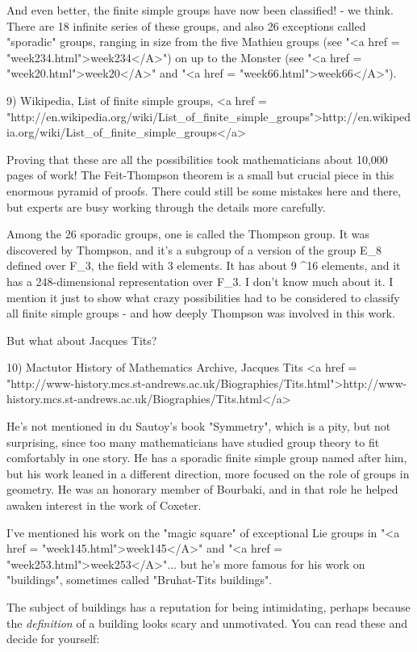 And even better, the finite simple groups have now been classified! -
we think.  There are 18 infinite series of these groups, and also 26
exceptions called "sporadic" groups, ranging in size from
the five Mathieu groups (see "<a href =
"week234.html">week234</A>") on up to the Monster (see "<a
href = "week20.html">week20</A>" and "<a href =
"week66.html">week66</A>").

9) Wikipedia, List of finite simple groups, 
<a href = "http://en.wikipedia.org/wiki/List_of_finite_simple_groups">http://en.wikipedia.org/wiki/List_of_finite_simple_groups</a>

Proving that these are all the possibilities took mathematicians 
about 10,000 pages of work!  The Feit-Thompson theorem is a small 
but crucial piece in this enormous pyramid of proofs.  There could 
still be some mistakes here and there, but experts are busy working 
through the details more carefully.

Among the 26 sporadic groups, one is called the Thompson group.  It
was discovered by Thompson, and it's a subgroup of a version of the
group E_{8} defined over F_{3}, the field with 3
elements.  It has about 9 ^{16} elements, and it has
a 248-dimensional representation over F_{3}.  I don't know
much about it.  I mention it just to show what crazy possibilities had
to be considered to classify all finite simple groups - and how deeply
Thompson was involved in this work.

But what about Jacques Tits?

10) Mactutor History of Mathematics Archive, Jacques Tits
<a href = "http://www-history.mcs.st-andrews.ac.uk/Biographies/Tits.html">http://www-history.mcs.st-andrews.ac.uk/Biographies/Tits.html</a>

He's not mentioned in du Sautoy's book "Symmetry", which is a
pity, but not surprising, since too many mathematicians have
studied group theory to fit comfortably in one story.  He
has a sporadic finite simple group named after him, but his
work leaned in a different direction, more focused on the role
of groups in geometry.  He was an honorary member of Bourbaki,
and in that role he helped awaken interest in the work of Coxeter.

I've mentioned his work on the "magic square" of exceptional
Lie groups in "<a href = "week145.html">week145</A>" and
"<a href = "week253.html">week253</A>"... but he's more
famous for his work on "buildings", sometimes called
"Bruhat-Tits buildings".

The subject of buildings has a reputation for being intimidating,
perhaps because the \emph{definition} of a building looks scary and
unmotivated.  You can read these and decide for yourself:

